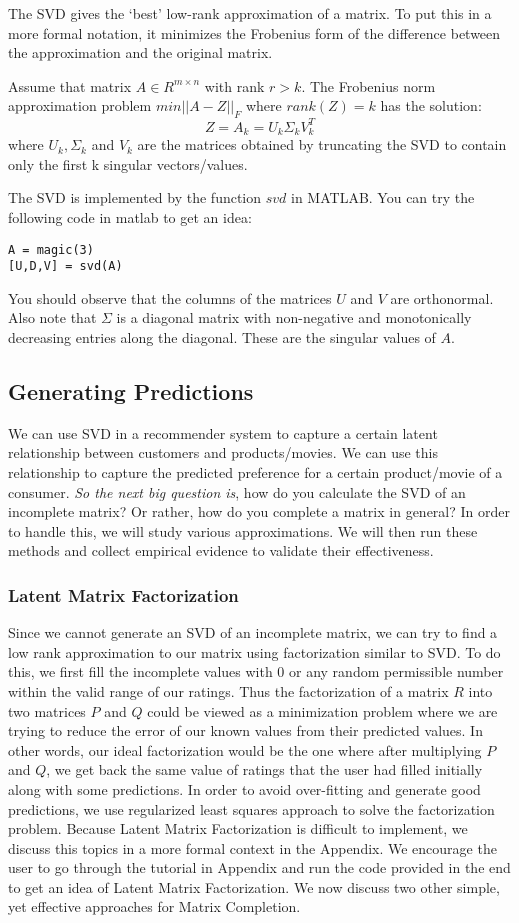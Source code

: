 The SVD gives the `best' low-rank approximation of a matrix. To put this in a more formal notation, it minimizes the Frobenius form of the difference between the approximation and the original matrix.

Assume that matrix $A \in R^{m \times n}$ with rank $r > k$. The Frobenius norm approximation problem $min || A - Z ||_{F}$ where $rank(Z) = k$ has the solution:
\[Z = A_{k} = U_{k} \Sigma_{k} V_{k}^{T}\]
where $U_{k}, \Sigma_{k}$ and $V_{k}$ are the matrices obtained by truncating the SVD to contain only the first k singular vectors/values.

The SVD is implemented by the function $svd$ in MATLAB. You can try the following code in matlab to get an idea:
\begin{verbatim}
A = magic(3)
[U,D,V] = svd(A)
\end{verbatim}

You should observe that the columns of the matrices $U$ and $V$ are orthonormal. Also note that $\Sigma$ is a diagonal matrix with non-negative and monotonically decreasing entries along the diagonal. These are the singular values of $A$.
  \subsection{Generating Predictions}
  We can use SVD in a recommender system to capture a certain latent relationship between customers and products/movies. We can use this relationship to capture the predicted preference for a certain product/movie of a consumer. \textit{So the next big question is}, how do you calculate the SVD of an incomplete matrix? Or rather, how do you complete a matrix in general? In order to handle this, we will study various approximations. We will then run these methods and collect empirical evidence to validate their effectiveness.
  \subsubsection{Latent Matrix Factorization}
  Since we cannot generate an SVD of an incomplete matrix, we can try to find a low rank approximation to our matrix using factorization similar to SVD. To do this, we first fill the incomplete values with 0 or any random permissible number within the valid range of our ratings. Thus the factorization of a matrix $R$ into two matrices $P$ and $Q$ could be viewed as a minimization problem where we are trying to reduce the error of our known values from their predicted values. In other words, our ideal factorization would be the one where after multiplying $P$ and $Q$, we get back the same value of ratings that the user had filled initially along with some predictions. In order to avoid over-fitting and generate good predictions, we use regularized least squares approach to solve the factorization problem. Because Latent Matrix Factorization is difficult to implement, we discuss this topics in a more formal context in the Appendix. We encourage the user to go through the tutorial in Appendix and run the code provided in the end to get an idea of Latent Matrix Factorization. We now discuss two other simple, yet effective approaches for Matrix Completion.
